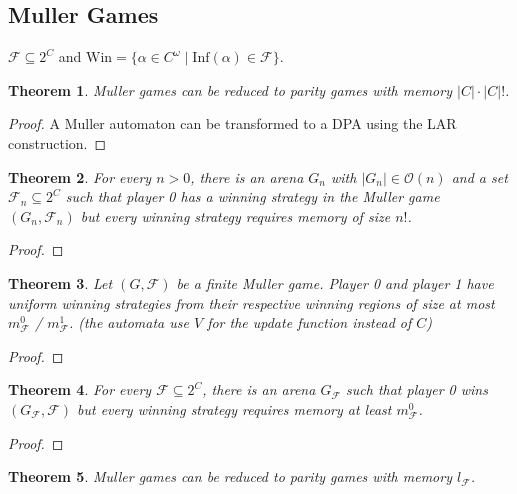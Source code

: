 \documentclass{article}
\newtheorem{theorem}{Theorem}
\begin{document}
\subsection{Muller Games}
$\mathcal{F} \subseteq 2^C$ and $\text{Win} = \{ \alpha \in C^\omega \mid \text{Inf}(\alpha) \in \mathcal{F} \}$.

\begin{theorem}
	Muller games can be reduced to parity games with memory $|C| \cdot |C|!$.
\end{theorem}
\begin{proof}
	A Muller automaton can be transformed to a DPA using the LAR construction.
\end{proof}

\begin{theorem}
	For every $n > 0$, there is an arena $G_n$ with $|G_n| \in \mathcal{O}(n)$ and a set $\mathcal{F}_n \subseteq 2^C$ such that player 0 has a winning strategy in the Muller game $(G_n, \mathcal{F}_n)$ but every winning strategy requires memory of size $n!$.
\end{theorem}
\begin{proof}
\end{proof}

\begin{theorem}
	Let $(G, \mathcal{F})$ be a finite Muller game. Player 0 and player 1 have uniform winning strategies from their respective winning regions of size at most $m^0_\mathcal{F}$ / $m^1_\mathcal{F}$. (the automata use $V$ for the update function instead of $C$)
\end{theorem}
\begin{proof}
\end{proof}

\begin{theorem}
	For every $\mathcal{F} \subseteq 2^C$, there is an arena $G_\mathcal{F}$ such that player 0 wins $(G_\mathcal{F}, \mathcal{F})$ but every winning strategy requires memory at least $m^0_\mathcal{F}$.
\end{theorem}
\begin{proof}
\end{proof}

\begin{theorem}
	Muller games can be reduced to parity games with memory $l_\mathcal{F}$.
\end{theorem}
\end{document}
